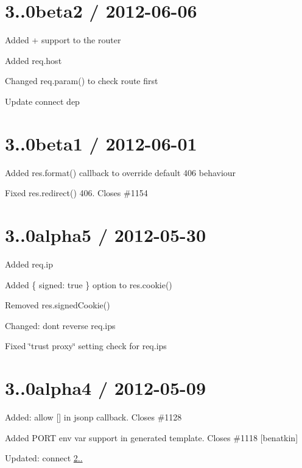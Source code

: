 \section*{3..\+0beta2 / 2012-\/06-\/06 }


\begin{DoxyItemize}
\item Added {\ttfamily +} support to the router
\item Added {\ttfamily req.\+host}
\item Changed {\ttfamily req.\+param()} to check route first
\item Update connect dep
\end{DoxyItemize}

\section*{3..\+0beta1 / 2012-\/06-\/01 }


\begin{DoxyItemize}
\item Added {\ttfamily res.\+format()} callback to override default 406 behaviour
\item Fixed {\ttfamily res.\+redirect()} 406. Closes \#1154
\end{DoxyItemize}

\section*{3..\+0alpha5 / 2012-\/05-\/30 }


\begin{DoxyItemize}
\item Added {\ttfamily req.\+ip}
\item Added {\ttfamily \{ signed\+: true \}} option to {\ttfamily res.\+cookie()}
\item Removed {\ttfamily res.\+signed\+Cookie()}
\item Changed\+: dont reverse {\ttfamily req.\+ips}
\item Fixed \char`\"{}trust proxy\char`\"{} setting check for {\ttfamily req.\+ips}
\end{DoxyItemize}

\section*{3..\+0alpha4 / 2012-\/05-\/09 }


\begin{DoxyItemize}
\item Added\+: allow {\ttfamily \mbox{[}\mbox{]}} in jsonp callback. Closes \#1128
\item Added {\ttfamily P\+O\+R\+T} env var support in generated template. Closes \#1118 \mbox{[}benatkin\mbox{]}
\item Updated\+: connect \hyperlink{namespace2_1_12_1_12}{2..}
\end{DoxyItemize}

